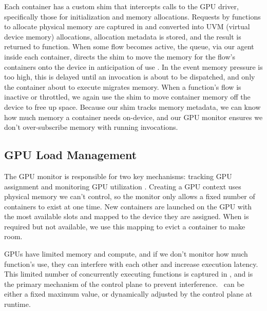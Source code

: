 Each container has a custom shim that intercepts calls to the GPU driver, specifically those for initialization and memory allocations.
Requests by functions to allocate physical memory are captured in and converted into UVM (virtual device memory) allocations, allocation metadata is stored, and the result is returned to function.
When some flow becomes active, the queue, via our agent inside each container, directs the shim to move the memory for the flow's containers onto the device in anticipation of use .
In the event memory pressure is too high, this is delayed until an invocation is about to be dispatched, and only the container about to execute migrates memory.
When a function's flow is inactive or throttled, we again use the shim to move container memory off the device to free up space.
Because our shim tracks memory metadata, we can know how much memory a container needs on-device, and our GPU monitor ensures we don't over-subscribe memory with running invocations.

\subsection{GPU Load Management}
\label{sec:gpu-man}

The GPU monitor is responsible for two key mechanisms: tracking GPU assignment and monitoring GPU utilization .
Creating a GPU context uses physical memory we can't control, so the monitor only allows a fixed number of containers to exist at one time.
New containers are launched on the GPU with the most available slots and mapped to the device they are assigned.
When is required but not available, we use this mapping to evict a container to make room.

GPUs have limited memory and compute, and if we don't monitor how much function's use, they can interfere with each other and increase execution latency.
This limited number of concurrently executing functions is captured in \D, and is the primary mechanism of the control plane to prevent interference.
\D~can be either a fixed maximum value, or dynamically adjusted by the control plane at runtime.

